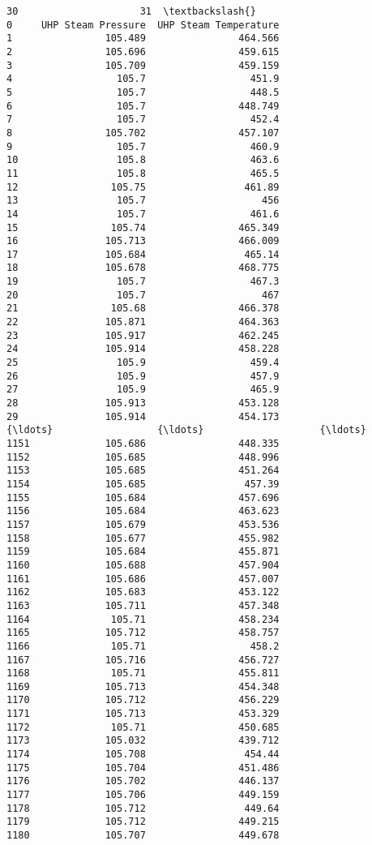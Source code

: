 \documentclass[11pt]{article}
\begin{document}
\begin{tcolorbox}[breakable, size=fbox, boxrule=.5pt, pad at break*=1mm, opacityfill=0]
\begin{Verbatim}[commandchars=\\\{\}]
                      30                     31  \textbackslash{}
0     UHP Steam Pressure  UHP Steam Temperature
1                105.489                464.566
2                105.696                459.615
3                105.709                459.159
4                  105.7                  451.9
5                  105.7                  448.5
6                  105.7                448.749
7                  105.7                  452.4
8                105.702                457.107
9                  105.7                  460.9
10                 105.8                  463.6
11                 105.8                  465.5
12                105.75                 461.89
13                 105.7                    456
14                 105.7                  461.6
15                105.74                465.349
16               105.713                466.009
17               105.684                 465.14
18               105.678                468.775
19                 105.7                  467.3
20                 105.7                    467
21                105.68                466.378
22               105.871                464.363
23               105.917                462.245
24               105.914                458.228
25                 105.9                  459.4
26                 105.9                  457.9
27                 105.9                  465.9
28               105.913                453.128
29               105.914                454.173
{\ldots}                  {\ldots}                    {\ldots}
1151             105.686                448.335
1152             105.685                448.996
1153             105.685                451.264
1154             105.685                 457.39
1155             105.684                457.696
1156             105.684                463.623
1157             105.679                453.536
1158             105.677                455.982
1159             105.684                455.871
1160             105.688                457.904
1161             105.686                457.007
1162             105.683                453.122
1163             105.711                457.348
1164              105.71                458.234
1165             105.712                458.757
1166              105.71                  458.2
1167             105.716                456.727
1168              105.71                455.811
1169             105.713                454.348
1170             105.712                456.229
1171             105.713                453.329
1172              105.71                450.685
1173             105.032                439.712
1174             105.708                 454.44
1175             105.704                451.486
1176             105.702                446.137
1177             105.706                449.159
1178             105.712                 449.64
1179             105.712                449.215
1180             105.707                449.678


\end{Verbatim}
\end{tcolorbox}
\end{document}
